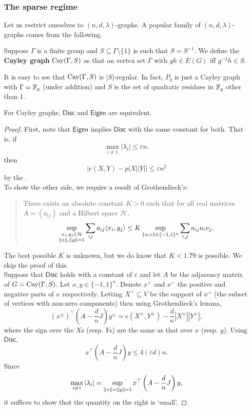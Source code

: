 		\subsubsection{The sparse regime}

			Let us restrict ourselves to $(n,d,\lambda)$-graphs. A popular family of $(n,d,\lambda)$-graphs comes from the following.

			\begin{fdef}
				Suppose $\Gamma$ is a finite group and $S\subseteq\Gamma\setminus\{1\}$ is such that $S = S^{-1}$. We define the \textbf{Cayley graph} $\operatorname{Cay}(\Gamma,S)$ as that on vertex set $\Gamma$ with $gh \in E(G)$ iff $g^{-1} h \in S$.
			\end{fdef}

			It is easy to see that $\operatorname{Cay}(\Gamma,S)$ is $|S|$-regular. In fact, $P_q$ is just a Cayley graph with $\Gamma = \mathbb{F}_q$ (under addition) and $S$ is the set of quadratic residues in $\mathbb{F}_q$ other than $1$.

			\begin{ftheo}
				For Cayley graphs, $\mathsf{Disc}$ and $\mathsf{Eigen}$ are equivalent.
			\end{ftheo}
			\begin{proof}

				First, note that $\mathsf{Eigen}$ implies $\mathsf{Disc}$ with the same constant for both. That is, if
				\[  \max_{i\ne 1} |\lambda_i| \le \varepsilon n.  \]
				then
				\[ \left| e(X,Y) - p|X||Y| \right| \le \varepsilon n^2 \]
				by the .\\
				To show the other side, we require a result of Grothendieck's:
				\begin{quote}
					There exists an absolute constant $K > 0$ such that for all real matrices $A = (a_{ij})$ and a Hilbert space $\mathcal{H}$,
					\[ \sup_{\substack{x_i,y_j \in \mathcal{H} \\ \left\lVert x\right\rVert,\left\lVert y\right\rVert = 1}} \sum_{ij} a_{ij} \langle x_i , y_j \rangle \le K \sup_{\{u,v\}\in\{-1,1\}^n} \sum_{i,j} a_{ij} u_i v_j. \]
				\end{quote}
				The best possible $K$ is unknown, but we do know that $K < 1.79$ is possible. We skip the proof of this.\\
				Suppose that $\mathsf{Disc}$ holds with a constant of $\varepsilon$ and let $A$ be the adjacency matrix of $G = \operatorname{Cay}(\Gamma,S)$. Let $x,y\in\{-1,1\}^n$. Denote $x^+$ and $x^-$ the positive and negative parts of $x$ respectively. Letting $X^+ \subseteq V$ be the support of $x^+$ (the subset of vertices with non-zero components) then using Grothendieck's lemma,
				\[ (x^\pm)^\top \left( A - \frac{d}{n} J \right) y^\pm = e(X^\pm,Y^\pm) - \frac{d}{n} |X^\pm| |Y^\pm|, \]
				where the sign over the $X$s (resp. $Y$s) are the same as that over $x$ (resp. $y$). Using $\mathsf{Disc}$,
				\[ x^\top \left( A - \frac{d}{n}J \right)y \le 4(\varepsilon d)n. \]
				Since
				\[ \max_{i \ne 1} |\lambda_i| = \sup_{\left\lVert x\right\rVert = \left\lVert y\right\rVert = 1} x^\top \left(A - \frac{d}{n}J\right) y, \]
				it suffices to show that the quantity on the right is `small'.
			\end{proof}


\clearpage